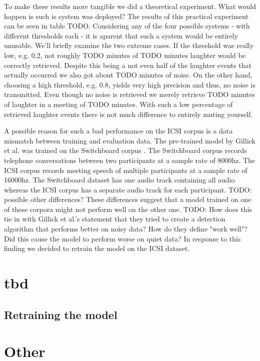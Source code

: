 \documentclass[bsc,frontabs,parskip,deptreport]{infthesis}
\begin{document}
To make these results more tangible we did a theoretical experiment. What would happen is such is system was deployed? The results of this practical experiment can be seen in table TODO. 
Considering any of the four possible systems - with different thresholds each - it is aparent that such a system would be entirely unusable. We'll briefly examine the two extreme cases. If the threshold was really low, e.g. 0.2, not roughly TODO minutes of TODO minutes laughter would be correctly retrieved. Despite this being a not even half of the laughter events that actually occurred we also got about TODO minutes of noise.  
On the other hand, choosing a high threshold, e.g. 0.8, yields very high precision and thus, no noise is transmitted. Even though no noise is retrieved we merely retrieve TODO minutes of laughter in a meeting of TODO minutes. With such a low percentage of retrieved laughter events there is not much difference to entirely muting yourself. 

A possible reason for such a bad performance on the ICSI corpus is a data mismatch between training and evaluation data. The pre-trained model by Gillick et al. \cite{gillick2021robust} was trained on the Switchboard corpus \cite{switchboard-corpus}. The Switchboard corpus records telephone conversations between two participants at a sample rate of 8000hz. The ICSI corpus records meeting speech of multiple participants at a sample rate of 16000hz. The Switchboard dataset has one audio track containing all audio whereas the ICSI corpus has a separate audio track for each participant.  
TODO: possible other differences?
These differences suggest that a model trained on one of these corpora might not perform well on the other one. 
TODO: How does this tie in with Gillick et al.'s statement that they tried to create a detection algorithm that performs better on noisy data? How do they define "work well"? Did this cause the model to perform worse on quiet data?
In response to this finding we decided to retrain the model on the ICSI dataset. 

\chapter{tbd}
\section{Retraining the model}

\chapter{Other}
\end{document}
